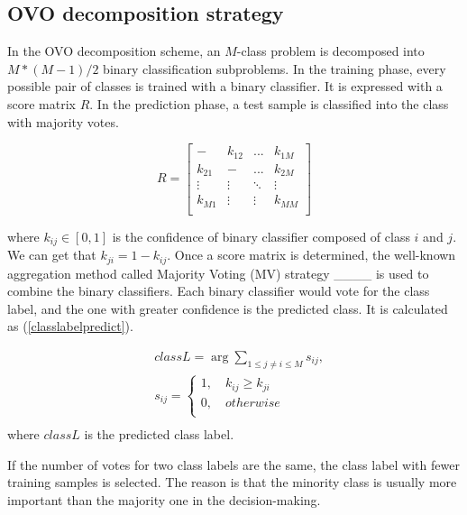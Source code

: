 \subsection{OVO decomposition strategy}
\label{OVO}

In the OVO decomposition scheme, an $M$-class problem is decomposed into $ M*(M-1)/2 $ binary classification subproblems. In the training phase, every possible pair of classes is trained with a binary classifier. It is expressed with a score matrix $R$. In the prediction phase, a test sample is classified into the class with majority votes. 

\begin{equation}
	R=
	\begin{bmatrix}
		- & k_{12} & ... & k_{1M} \\
		k_{21} & - & ... & k_{2M} \\
		\vdots & \vdots & \ddots & \vdots \\
		k_{M1} & \vdots & \vdots & k_{MM} \\
	\end{bmatrix}
\end{equation}

\noindent where $k_{ij}\in{ [0,1]}$ is the confidence of binary classifier composed of class $i$ and $j$. We can get that $k_{ji}=1-k_{ij}$. Once a score matrix is determined, the well-known aggregation method called Majority Voting (MV) strategy ____ is used to combine the binary classifiers. Each binary classifier would vote for the class label, and the one with greater confidence is the predicted class. It is calculated as (\ref{classlabelpredict}).

\begin{equation}\label{classlabelpredict}
	\begin{split}
		& classL = \mathop{\arg\max_{i=1,...,M}}\sum_{1\leq j\neq i\leq M}s_{ij},\\
		& s_{ij} = \left\{
		\begin{array}{rcl}
			1,\quad k_{ij}\geq k_{ji}\\
			0,\quad otherwise\\
		\end{array} \right. \\
	\end{split}
\end{equation}
\noindent where $classL$ is the predicted class label.

If the number of votes for two class labels are the same, the class label with fewer training samples is selected. The reason is that the minority class is usually more important than the majority one in the decision-making.

